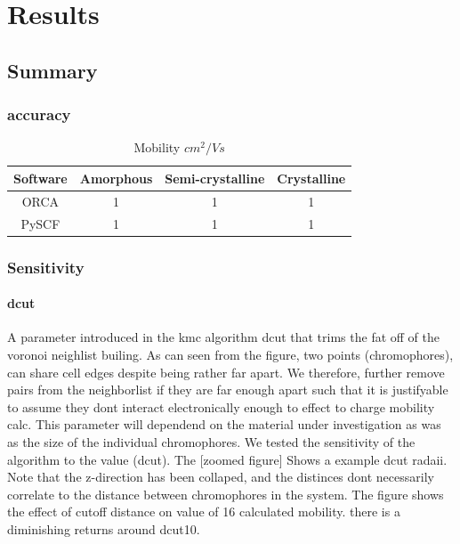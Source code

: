 \chapter{Results}
\label{chap:results}

\section{Summary}

\subsection{accuracy}

\begin{table}[ht]
    \caption{Mobility $cm^{2}/Vs$} %
\centering %
\begin{tabular}{c c c c} %
\hline\hline %
Software & Amorphous & Semi-crystalline & Crystalline \\ [0.5ex] %
\hline %
ORCA & 1 & 1 & 1 \\ %
PySCF & 1 & 1 & 1 \\ [1ex] %
\hline %
\end{tabular}
\label{table:nonlin} %
\end{table}

\subsection{Sensitivity}

\subsubsection{dcut}

A parameter introduced in the kmc algorithm dcut that trims the fat off of the voronoi neighlist builing.
As can seen from the figure, two points (chromophores), can share cell edges despite being rather far apart. We
therefore, further remove pairs from the neighborlist if they are far enough apart such that it is justifyable
to assume they dont interact electronically enough to effect to charge mobility calc. This parameter will
dependend on the material under investigation as was as the size of the individual chromophores. We tested the
sensitivity of the algorithm to the value (dcut). The [zoomed figure] Shows a example dcut radaii. Note that
the z-direction has been collaped, and the distinces dont necessarily correlate to the distance
between chromophores in the system. The figure shows the effect of cutoff distance on value of
16 calculated mobility. there is a diminishing returns around dcut10.


